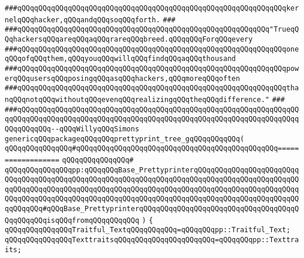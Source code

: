 \verb|###qQQqqQQqqQQqqQQqqQQqqQQqqQQqqQQqqQQqqQQqqQQqqQQqqQQqqQQqqQQqqQQqkernelqQQqhacker,qQQqandqQQqsoqQQqforth.|\newline
\verb|###|\newline
\verb|###qQQqqQQqqQQqqQQqqQQqqQQqqQQqqQQqqQQqqQQqqQQqqQQqqQQqqQQqqQQq"TrueqQQqhackersqQQqareqQQqaqQQqrareqQQqbreed.qQQqqQQqForqQQqevery|\newline
\verb|###qQQqqQQqqQQqqQQqqQQqqQQqqQQqqQQqqQQqqQQqqQQqqQQqqQQqqQQqqQQqqQQqoneqQQqofqQQqthem,qQQqyouqQQqwillqQQqfindqQQqaqQQqthousand|\newline
\verb|###qQQqqQQqqQQqqQQqqQQqqQQqqQQqqQQqqQQqqQQqqQQqqQQqqQQqqQQqqQQqqQQqpowerqQQqusersqQQqposingqQQqasqQQqhackers,qQQqmoreqQQqoften|\newline
\verb|###qQQqqQQqqQQqqQQqqQQqqQQqqQQqqQQqqQQqqQQqqQQqqQQqqQQqqQQqqQQqqQQqthanqQQqnotqQQqwithoutqQQqevenqQQqrealizingqQQqtheqQQqdifference."|\newline
\verb|###|\newline
\verb|###qQQqqQQqqQQqqQQqqQQqqQQqqQQqqQQqqQQqqQQqqQQqqQQqqQQqqQQqqQQqqQQqqQQqqQQqqQQqqQQqqQQqqQQqqQQqqQQqqQQqqQQqqQQqqQQqqQQqqQQqqQQqqQQqqQQqqQQqqQQqqQQqqQQq--qQQqWillyqQQqSimons|\newline
\newline
\newline
\newline
\verb|genericqQQqpackageqQQqqQQqprettyprint_tree_gqQQqqQQqqQQq(|\newline
\verb|qQQqqQQqqQQqqQQq#qQQqqQQqqQQqqQQqqQQqqQQqqQQqqQQqqQQqqQQqqQQqqQQq==================|\newline
\verb|qQQqqQQqqQQqqQQq#|\newline
\verb|qQQqqQQqqQQqqQQqpp:qQQqqQQqBase_PrettyprinterqQQqqQQqqQQqqQQqqQQqqQQqqQQqqQQqqQQqqQQqqQQqqQQqqQQqqQQqqQQqqQQqqQQqqQQqqQQqqQQqqQQqqQQqqQQqqQQqqQQqqQQqqQQqqQQqqQQqqQQqqQQqqQQqqQQqqQQqqQQqqQQqqQQqqQQqqQQqqQQqqQQqqQQqqQQqqQQqqQQqqQQqqQQqqQQqqQQqqQQqqQQqqQQqqQQqqQQqqQQqqQQqqQQqqQQqqQQqqQQqqQQq#qQQqBase_PrettyprinterqQQqqQQqqQQqqQQqqQQqqQQqqQQqqQQqqQQqqQQqqQQqqQQqisqQQqfromqQQqqQQqqQQq|\newline
\verb|)|\newline
\verb|{|\newline
\verb|qQQqqQQqqQQqqQQqTraitful_TextqQQqqQQqqQQq=qQQqqQQqpp::Traitful_Text;|\newline
\verb|qQQqqQQqqQQqqQQqTexttraitsqQQqqQQqqQQqqQQqqQQqqQQq=qQQqqQQqpp::Texttraits;|\newline
